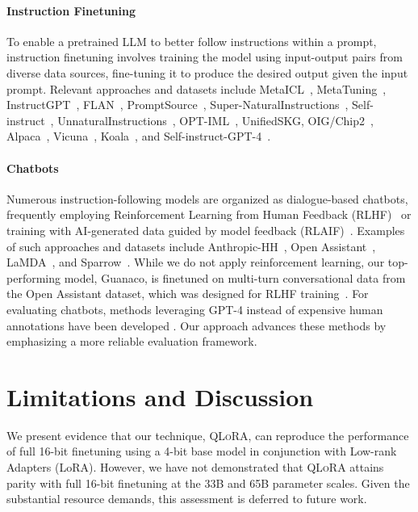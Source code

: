 \paragraph{Instruction Finetuning} To enable a pretrained LLM to better follow instructions within a prompt, instruction finetuning involves training the model using input-output pairs from diverse data sources, fine-tuning it to produce the desired output given the input prompt. Relevant approaches and datasets include MetaICL~\citep{min2021metaicl}, MetaTuning~\citep{zhong2021adapting}, InstructGPT~\citep{ouyang2022training}, FLAN~\citep{wei2021finetuned,chung2022scaling}, PromptSource~\citep{bach2022promptsource}, Super-NaturalInstructions~\citep{wang2022super,sanh2021multitask}, Self-instruct~\citep{wang2022self}, UnnaturalInstructions~\citep{honovich2022unnatural}, OPT-IML~\citep{iyer2022opt}, UnifiedSKG\citep{xie2022unifiedskg}, OIG/Chip2~\citep{laion2023}, Alpaca~\citep{alpaca}, Vicuna~\citep{vicuna2023}, Koala~\citep{koala_blogpost_2023}, and Self-instruct-GPT-4~\citep{peng2023instruction}.

\paragraph{Chatbots} Numerous instruction-following models are organized as dialogue-based chatbots, frequently employing Reinforcement Learning from Human Feedback (RLHF)~\citep{christiano2017deep} or training with AI-generated data guided by model feedback (RLAIF)~\citep{bai2022constitutional}. Examples of such approaches and datasets include Anthropic-HH~\citep{askell2021general,bai2022training}, Open Assistant~\citep{kopf2023openassistant}, LaMDA~\citep{thoppilan2022lamda}, and Sparrow~\citep{glaese2022improving}. While we do not apply reinforcement learning, our top-performing model, Guanaco, is finetuned on multi-turn conversational data from the Open Assistant dataset, which was designed for RLHF training~\citep{kopf2023openassistant}. For evaluating chatbots, methods leveraging GPT-4 instead of expensive human annotations have been developed \citep{vicuna2023,peng2023instruction}. Our approach advances these methods by emphasizing a more reliable evaluation framework.

\section{Limitations and Discussion}

We present evidence that our technique, \textsc{QLoRA}, can reproduce the performance of full 16-bit finetuning using a 4-bit base model in conjunction with Low-rank Adapters (LoRA). However, we have not demonstrated that \textsc{QLoRA} attains parity with full 16-bit finetuning at the 33B and 65B parameter scales. Given the substantial resource demands, this assessment is deferred to future work.

